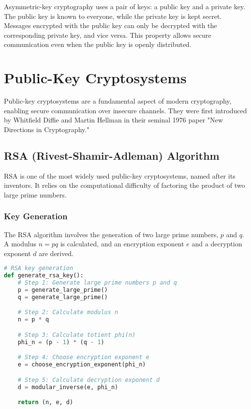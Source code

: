 \documentclass{article}
\begin{document}
Asymmetric-key cryptography uses a pair of keys: a public key and a private key. The public key is known to everyone, while the private key is kept secret. Messages encrypted with the public key can only be decrypted with the corresponding private key, and vice versa. This property allows secure communication even when the public key is openly distributed.

\section{Public-Key Cryptosystems}

Public-key cryptosystems are a fundamental aspect of modern cryptography, enabling secure communication over insecure channels. They were first introduced by Whitfield Diffie and Martin Hellman in their seminal 1976 paper "New Directions in Cryptography."

\subsection{RSA (Rivest-Shamir-Adleman) Algorithm}

RSA is one of the most widely used public-key cryptosystems, named after its inventors. It relies on the computational difficulty of factoring the product of two large prime numbers.

\subsubsection{Key Generation}

The RSA algorithm involves the generation of two large prime numbers, $p$ and $q$. A modulus $n = pq$ is calculated, and an encryption exponent $e$ and a decryption exponent $d$ are derived.

\begin{lstlisting}[language=Python]
# RSA key generation
def generate_rsa_key():
    # Step 1: Generate large prime numbers p and q
    p = generate_large_prime()
    q = generate_large_prime()

    # Step 2: Calculate modulus n
    n = p * q

    # Step 3: Calculate totient phi(n)
    phi_n = (p - 1) * (q - 1)

    # Step 4: Choose encryption exponent e
    e = choose_encryption_exponent(phi_n)

    # Step 5: Calculate decryption exponent d
    d = modular_inverse(e, phi_n)

    return (n, e, d)
\end{lstlisting}
\end{document}

